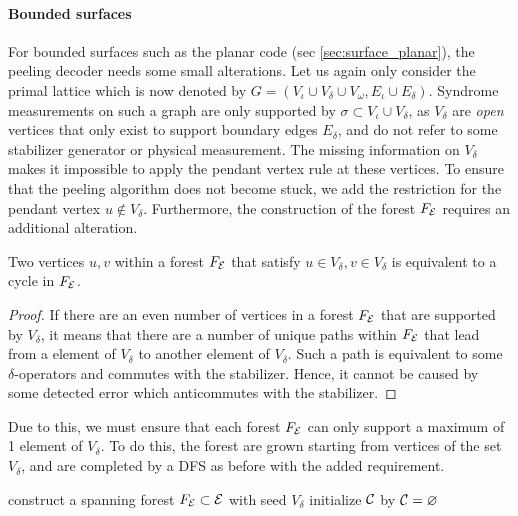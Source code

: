\paragraph{Bounded surfaces}
For bounded surfaces such as the planar code (sec \ref{sec:surface_planar}), the peeling decoder needs some small alterations. Let us again only consider the primal lattice which is now denoted by $G = (V_\iota\cup V_{\delta} \cup V_{\omega}, E_\iota \cup E_{\delta})$. Syndrome measurements on such a graph are only supported by $\sigma \subset V_\iota\cup V_\delta$, as $V_\delta$ are \emph{open} vertices that only exist to support boundary edges $E_\delta$, and do not refer to some stabilizer generator or physical measurement. The missing information on $V_\delta$ makes it impossible to apply the pendant vertex rule at these vertices. To ensure that the peeling algorithm does not become stuck, we add the restriction for the pendant vertex $u \notin V_\delta$. Furthermore, the construction of the forest $F_{\mathcal{E}}$ requires an additional alteration.
\begin{lemma}
  Two vertices $u,v$ within a forest $F_{\mathcal{E}}$ that satisfy $u\in V_\delta, v \in V_\delta$ is equivalent to a cycle in $F_{\mathcal{E}}$. 
\end{lemma}
\begin{proof}
  If there are an even number of vertices in a forest $F_{\mathcal{E}}$ that are supported by $V_\delta$, it means that there are a number of unique paths within $F_{\mathcal{E}}$ that lead from a element of $V_\delta$ to another element of $V_\delta$. Such a path is equivalent to some $\delta$-operators and commutes with the stabilizer. Hence, it cannot be caused by some detected error which anticommutes with the stabilizer.
\end{proof}
Due to this, we must ensure that each forest $F_{\mathcal{E}}$ can only support a maximum of 1 element of $V_\delta$. To do this, the forest are grown starting from vertices of the set $V_\delta$, and are completed by a DFS as before with the added requirement. 
\begin{algo}[algotitle=Peeling decoder for bounded surfaces (adapted from \cite{delfosse2017linear}), label=algo:peelbound]
  \begin{algorithm}[H]
    \BlankLine
    construct a spanning forest $F_{\mathcal{E}}\subset\mathcal{E}$ with seed $V_\delta$\;
    initialize $\mathcal{C}$ by $\mathcal{C} = {\varnothing}$\;
  \end{algorithm}
\end{algo}


